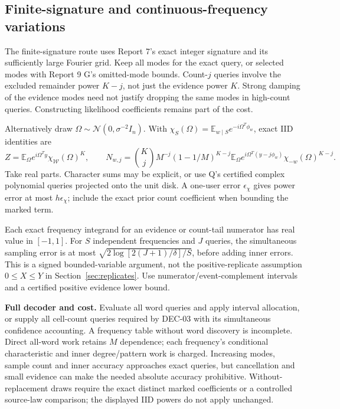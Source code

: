 \documentclass[10pt,a4paper]{article}
\newcommand{\E}{\mathbb E}
\begin{document}
\subsection{Finite-signature and continuous-frequency variations}
The finite-signature route uses Report 7's exact integer signature and its sufficiently large Fourier
grid. Keep all modes for the exact query, or selected modes with Report 9 G's omitted-mode bounds.
Count-$j$ queries involve the excluded remainder power $K-j$, not just the evidence power $K$.
Strong damping of the evidence modes need not justify dropping the same modes in high-count queries.
Constructing likelihood coefficients remains part of the cost.

Alternatively draw $\Omega\sim\mathcal N(0,\sigma^{-2}I_n)$.
With $\chi_S(\Omega)=\E_{w\mid S}e^{-i\Omega^T\phi_w}$, exact IID identities are
\[
 Z=\E_\Omega e^{i\Omega^Ty}\chi_{\mathcal W}(\Omega)^K,\qquad
 N_{w,j}=\binom Kj M^{-j}(1-1/M)^{K-j}
 \E_\Omega e^{i\Omega^T(y-j\phi_w)}\chi_{-w}(\Omega)^{K-j}.
\]
Take real parts. Character sums may be explicit, or use Q's certified complex polynomial queries
projected onto the unit disk. A one-user error $\epsilon_\chi$ gives power error at most $h\epsilon_\chi$;
include the exact prior count coefficient when bounding the marked term.

Each exact frequency integrand for an evidence or count-tail numerator has real value in $[-1,1]$.
For $S$ independent frequencies and $J$ queries, the simultaneous sampling error is at most
$\sqrt{2\log[2(J+1)/\delta]/S}$, before adding inner errors.
This is a signed bounded-variable argument, not the positive-replicate assumption
$0\leq X\leq Y$ in Section~\ref{sec:replicates}.
Use numerator/event-complement intervals and a certified positive evidence lower bound.

\textbf{Full decoder and cost.} Evaluate all word queries and apply interval allocation, or supply all
cell-count queries required by DEC-03 with its simultaneous confidence accounting.
A frequency table without word discovery is incomplete. Direct all-word work retains $M$ dependence;
each frequency's conditional characteristic and inner degree/pattern work is charged.
Increasing modes, sample count and inner accuracy approaches exact queries, but cancellation and small
evidence can make the needed absolute accuracy prohibitive.
Without-replacement draws require the exact distinct marked coefficients or a controlled source-law
comparison; the displayed IID powers do not apply unchanged.
\end{document}

